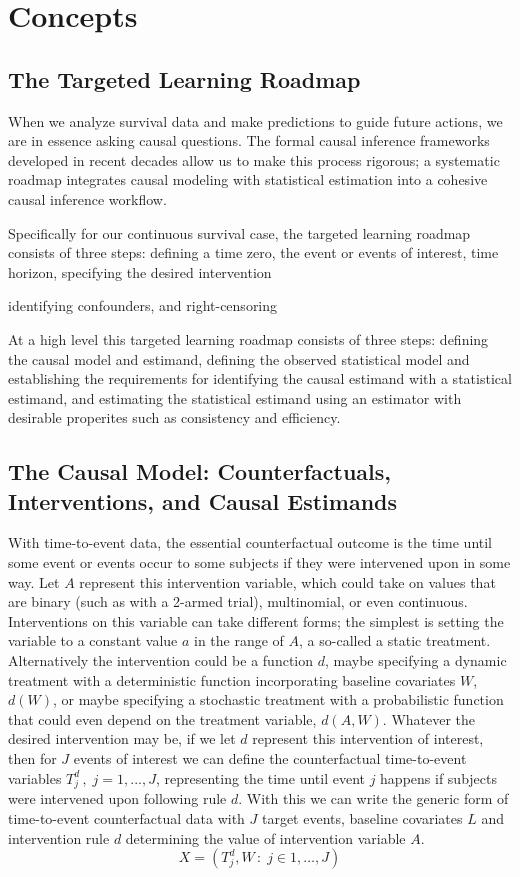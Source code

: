 \documentclass{report}
\newcommand{\1}{\ensuremath{\mathbf{1}}}
\renewcommand{\L}{\ensuremath{W}}
\begin{document}
\section{Concepts}
\label{sec:org37a21dd}

\subsection{The Targeted Learning Roadmap}
\label{sec:org4f6bf8c}
When we analyze survival data and make predictions to guide future actions, we are in essence asking causal questions. The formal causal inference frameworks developed in recent decades allow us to make this process rigorous; a systematic roadmap \cite{petersen_causal_2014} integrates causal modeling with statistical estimation into a cohesive causal inference workflow.

Specifically for our continuous survival case, the targeted learning roadmap consists of three steps: defining a time zero, the event or events of interest, time horizon, specifying the desired intervention

identifying confounders, and right-censoring

At a high level this targeted learning roadmap consists of three steps: defining the causal model and estimand, defining the observed statistical model and establishing the requirements for identifying the causal estimand with a statistical estimand, and estimating the statistical estimand using an estimator with desirable properites such as consistency and efficiency.

\subsection{The Causal Model: Counterfactuals, Interventions, and Causal Estimands}
\label{sec:org677340c}
With time-to-event data, the essential counterfactual outcome is the time until some event or events occur to some subjects if they were intervened upon in some way. Let \(A\) represent this intervention variable, which could take on values that are binary (such as with a 2-armed trial), multinomial, or even continuous. Interventions on this variable can take different forms; the simplest is setting the variable to a constant value \(a\) in the range of \(A\), a so-called a static treatment. Alternatively the intervention could be a function \(d\), maybe specifying a dynamic treatment with a deterministic function incorporating baseline covariates \(\L\), \(d(\L)\), or maybe specifying a stochastic treatment with a probabilistic function that could even depend on the treatment variable, \(d(A, \L)\). Whatever the desired intervention may be, if we let \(d\) represent this intervention of interest, then for \(J\) events of interest we can define the counterfactual time-to-event variables \(T^d_j \,,\; j = 1, ..., J\), representing the time until event \(j\) happens if subjects were intervened upon following rule \(d\). With this we can write the generic form of time-to-event counterfactual data with \(J\) target events, baseline covariates \(L\) and intervention rule \(d\) determining the value of intervention variable \(A\).
\[ X = \left( T^d_j, \L \,:\; j \in 1, \dots, J \right)\]
\end{document}
